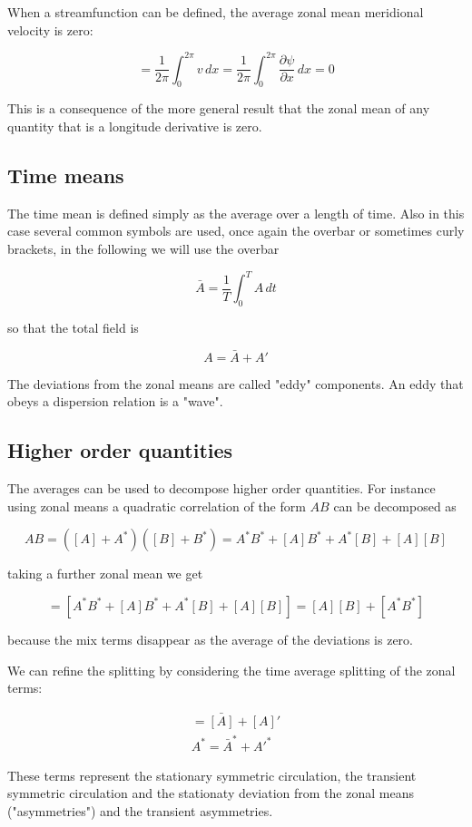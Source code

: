 When a streamfunction can be defined, the average zonal mean meridional
velocity is zero:

\[= \frac{1}{2\pi}\int_0^{2\pi} v \, dx=\frac{1}{2\pi}\int_0^{2\pi} \frac{\partial \psi}{\partial x} \, dx=0\]

This is a consequence of the more general result that the zonal mean of
any quantity that is a longitude derivative is zero.

\subsection{Time means}\label{time-means}

The time mean is defined simply as the average over a length of time.
Also in this case several common symbols are used, once again the
overbar or sometimes curly brackets, in the following we will use the
overbar

\[\bar{A} = \frac{1}{T}\int_0^{T} A \, dt\]

so that the total field is

\[A = \bar{A} + A'\]

The deviations from the zonal means are called "eddy" components. An
eddy that obeys a dispersion relation is a "wave".

\subsection{Higher order quantities}\label{Sect:Higher}

The averages can be used to decompose higher order quantities. For
instance using zonal means a quadratic correlation of the form \(A B\)
can be decomposed as

\[A B = ([A]+A^*)([B]+B^*) = A^*B^* + [A] B^*+ A^*[B] + [A][B]\]

taking a further zonal mean we get

{\[= [A^*B^*+ [A]B^* + A^*[B] + [A][B]] =  [A][B] + [A^*B^*]\]}

because the mix terms disappear as the average of the deviations is
zero.

We can refine the splitting by considering the time average splitting of
the zonal terms:

\[\begin{aligned}
= \bar{[A]} + [A]' \\
A^* = \bar{A}^* + A'^*
\end{aligned}\]

These terms represent the stationary symmetric circulation, the
transient symmetric circulation and the stationaty deviation from the
zonal means ("asymmetries") and the transient asymmetries.

